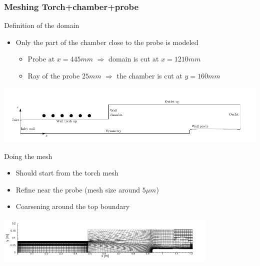\documentclass[compress,10pt]{beamer}
\begin{document}
 \begin{frame}
 \frametitle{Meshing Torch+chamber+probe}
 \begin{block}{Definition of the domain}
  \begin{itemize}
   \item Only the part of the chamber close to the probe is modeled
    \begin{itemize}
    \item Probe at $x=445mm$ $\Rightarrow$ domain is cut at $x=1210mm$
    \item Ray of the probe $25mm$ $\Rightarrow$ the chamber is cut at $y=160mm$ 
  \end{itemize}
\end{itemize}
 \end{block}
\includegraphics[width=\textwidth,viewport= 10 10 450 80,clip]{geometry_compl.pdf}\\
 \begin{block}{Doing the mesh}
  \begin{itemize}
   \item Should start from the torch mesh
   \item Refine near the probe (mesh size around $5 \mu m$)
   \item Coarsening around the top boundary
  \end{itemize}
 \end{block}
\includegraphics[width=0.8\textwidth,viewport= 0 10 450 80,clip]{chamber_pb_mesh.pdf}
 \end{frame}
\end{document}
